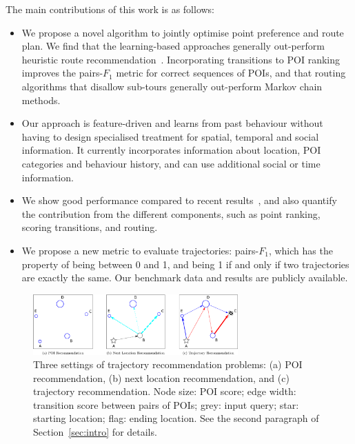The main contributions of this work is as follows:
\begin{itemize}
\setlength{\itemsep}{-2pt}
\item We propose a novel algorithm to jointly optimise point preference and route plan.
  We find that the learning-based approaches generally out-perform heuristic route recommendation~\cite{ijcai15}. Incorporating transitions to POI ranking improves the pairs-$F_1$ metric for correct sequences of POIs, and that routing algorithms that disallow sub-tours generally out-perform Markov chain methods.
\item Our approach is feature-driven and learns from past behaviour without having to design specialised treatment for spatial, temporal and social information. It currently incorporates information about location, POI categories and behaviour history, and can use additional social or time information.%
\item We show good performance compared to recent results~\cite{ijcai15}, and also quantify the contribution from the different components, such as point ranking, scoring transitions, and routing.
\item We propose a new metric to evaluate trajectories: pairs-$F_1$, which has the property of being between 0 and 1, and being 1 if and only if two trajectories are exactly the same. Our benchmark data and results are publicly available.
\end{itemize}

\begin{figure}[ht]
	\centering
	\includegraphics[width=0.7\textwidth]{fig/fig1-flavours.pdf}
	\caption{Three settings of trajectory recommendation problems: (a) POI recommendation, (b) next location recommendation, and (c) trajectory recommendation. Node size: POI score; edge width: transition score between pairs of POIs; grey: input query; star: starting location; flag: ending location. See the second paragraph of Section~\ref{sec:intro} for details.
}
	\label{fig:threesettings}
\end{figure}
